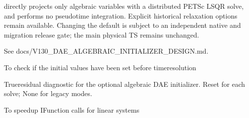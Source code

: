 \documentclass[letterpaper,10pt,english]{sphinxmanual}
\begin{document}
\begin{fulllineitems}
\begin{fulllineitems}
\sphinxAtStartPar
{} directly projects only
algebraic variables with a distributed PETSc LSQR solve, and
performs no pseudo\sphinxhyphen{}time integration. Explicit historical
relaxation options remain available. Changing the default
is subject to an independent native and migration release gate;
the main physical TS remains unchanged.

\sphinxAtStartPar
See docs/V130\_DAE\_ALGEBRAIC\_INITIALIZER\_DESIGN.md.

\end{fulllineitems}


\begin{fulllineitems}
\label{\detokenize{scrimp:scrimp.dphs.DPHS.initial_value_set}}
\pysigstartsignatures
\pysigline
{}
\pysigstopsignatures
\sphinxAtStartPar
To check if the initial values have been set before time\sphinxhyphen{}resolution

\end{fulllineitems}


\begin{fulllineitems}
\label{\detokenize{scrimp:scrimp.dphs.DPHS.initialization_report}}
\pysigstartsignatures
\pysigline
{}
\pysigstopsignatures
\sphinxAtStartPar
True\sphinxhyphen{}residual diagnostic for the optional algebraic DAE
initializer. Reset for each solve; None for legacy modes.

\end{fulllineitems}


\begin{fulllineitems}
\label{\detokenize{scrimp:scrimp.dphs.DPHS.linear_mass}}
\pysigstartsignatures
\pysigline
{}
\pysigstopsignatures
\sphinxAtStartPar
To speed\sphinxhyphen{}up IFunction calls for linear systems

\end{fulllineitems}


\end{fulllineitems}
\end{document}

